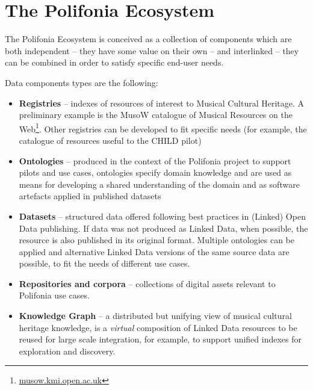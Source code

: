 \chapter{The Polifonia Ecosystem}\label{ch:ecosystem}

The Polifonia Ecosystem is conceived as a collection of components which are both independent -- they have some value on their own -- and interlinked -- they can be combined in order to satisfy specific end-user needs.

Data components types are the following:
\begin{itemize}
\item \textbf{Registries} -- indexes of resources of interest to Musical Cultural Heritage. A preliminary example is the MusoW catalogue of Musical Resources on the Web\footnote{\url{musow.kmi.open.ac.uk}}. Other registries can be developed to fit specific needs (for example, the catalogue of resources useful to the CHILD pilot)
\item \textbf{Ontologies} -- produced in the context of the Polifonia project to support pilots and use cases, ontologies specify domain knowledge and are used as means for developing a shared understanding of the domain and as software artefacts applied in published datasets
\item \textbf{Datasets} -- structured data offered following best practices in (Linked) Open Data publishing. If data was not produced as Linked Data, when possible, the resource is also published in its original format. Multiple ontologies can be applied and alternative Linked Data versions of the same source data are possible, to fit the needs of different use cases.
\item \textbf{Repositories and corpora} -- collections of digital assets relevant to Polifonia use cases.
\item \textbf{Knowledge Graph} -- a distributed but unifying view of musical cultural heritage knowledge, is a \textit{virtual} composition of Linked Data resources to be reused for large scale integration, for example, to support unified indexes for exploration and discovery. %

\end{itemize}

